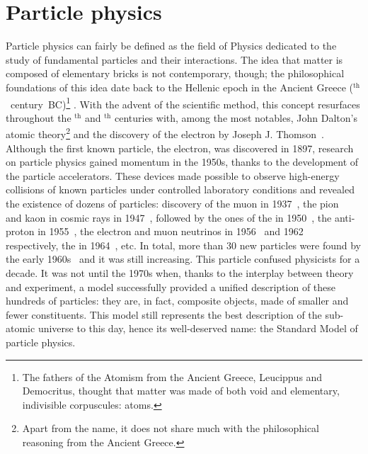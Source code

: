
\chapter{Particle physics}
\label{chap:ParticlePhysics}

Particle physics can fairly be defined as the field of Physics dedicated to the study of fundamental particles and their interactions. The idea that matter is composed of elementary bricks is not contemporary, though; the philosophical foundations of this idea date back to the Hellenic epoch in the Ancient Greece ($^{\text{th}}$~century~BC)\footnote{The fathers of the Atomism from the Ancient Greece, Leucippus and Democritus, thought that matter was made of both void and elementary, indivisible corpuscules: atoms.} \cite{pullmanAtomHistoryHuman1998}. With the advent of the scientific method, this concept resurfaces throughout the $^{\text{th}}$ and $^{\text{th}}$ centuries with, among the most notables, John Dalton's atomic theory\footnote{Apart from the name, it does not share much with the philosophical reasoning from the Ancient Greece.} and the discovery of the electron by Joseph J. Thomson~\cite{thomsonXLCathodeRays1897}. Although the first known particle, the electron, was discovered in 1897, research on particle physics gained momentum in the 1950s, thanks to the development of the particle accelerators. These devices made possible to observe high-energy collisions of known particles under controlled laboratory conditions and revealed the existence of dozens of particles: discovery of the muon in 1937~\cite{neddermeyerNoteNatureCosmicRay1937, streetNewEvidenceExistence1937}, the pion~\cite{lattesProcessesInvolvingCharged1947} and kaon in cosmic rays in 1947~\cite{degrangeTrackingLouisLeprinceRinguet2013, rochesterdr.EvidenceExistenceNew1947}, followed by the ones of the \rmLambda in 1950~\cite{hopperEvidenceConcerningExistence1950}, the anti-proton in 1955~\cite{chamberlainObservationAntiprotons1955}, the electron and muon neutrinos in 1956~\cite{reinesNeutrino1956} and 1962~\cite{danbyObservationHighEnergyNeutrino1962} respectively, the \rmOmega in 1964~\cite{barnesObservationHyperonStrangeness1964a}, etc. In total, more than 30 new particles were found by the early 1960s~\cite{serwayModernPhysics2004} and it was still increasing. This particle  confused physicists for a decade. It was not until the 1970s when, thanks to the interplay between theory and experiment, a model successfully provided a unified description of these hundreds of particles: they are, in fact, composite objects, made of smaller and fewer constituents. This model still represents the best description of the sub-atomic universe to this day, hence its well-deserved name: the Standard Model of particle physics. \\

